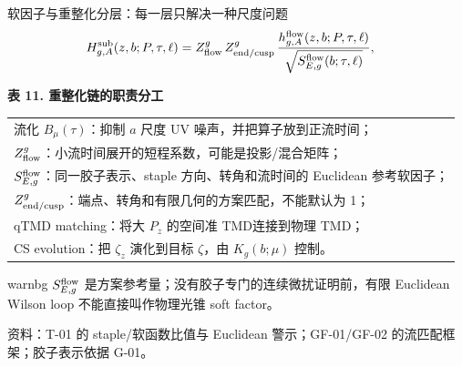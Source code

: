 \documentclass[UTF8,aspectratio=169,11pt]{ctexbeamer}
\newcommand{\source}[1]{%
  \par\vspace{-0.08em}%
  \noindent\parbox[t]{0.97\linewidth}{\raggedright\scriptsize\color{muted}资料：#1}\par}
\begin{document}
\begin{frame}[t]{软因子与重整化分层：每一层只解决一种尺度问题}
  \begin{align*}
    H_{g,A}^{\rm sub}(z,b;P,\tau,\ell)
    &=Z_{\rm flow}^g\,Z_{\rm end/cusp}^g\,
      \frac{h_{g,A}^{\rm flow}(z,b;P,\tau,\ell)}
      {\sqrt{S_{E,g}^{\rm flow}(b;\tau,\ell)}} ,
  \end{align*}
  \begin{center}
  \textbf{表 11. 重整化链的职责分工}
  \vspace{0.12em}
  {\scriptsize\begin{tabular}{@{}p{\linewidth}@{}}
    \toprule
    流化 $B_\mu(\tau)$：抑制 $a$ 尺度 UV 噪声，并把算子放到正流时间；\\
    $Z_{\rm flow}^g$：小流时间展开的短程系数，可能是投影/混合矩阵；\\
    $S_{E,g}^{\rm flow}$：同一胶子表示、staple 方向、转角和流时间的 Euclidean 参考软因子；\\
    $Z_{\rm end/cusp}^g$：端点、转角和有限几何的方案匹配，不能默认为 1；\\
    qTMD matching：将大 $P_z$ 的空间准 TMD连接到物理 TMD；\\
    CS evolution：把 $\zeta_z$ 演化到目标 $\zeta$，由 $K_g(b;\mu)$ 控制。\\
    \bottomrule
  \end{tabular}}
  \end{center}
  \begin{beamercolorbox}[wd=0.96\textwidth,sep=0.45em,rounded=true]{warnbg}
    $S_{E,g}^{\rm flow}$ 是方案参考量；没有胶子专门的连续微扰证明前，有限 Euclidean Wilson loop 不能直接叫作物理光锥 soft factor。
  \end{beamercolorbox}
  \source{T-01 的 staple/软函数比值与 Euclidean 警示；GF-01/GF-02 的流匹配框架；胶子表示依据 G-01。}
\end{frame}
\end{document}
